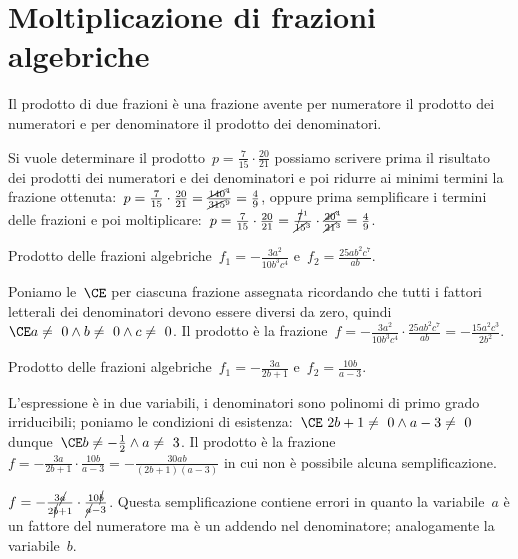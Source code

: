 

\section{Moltiplicazione di frazioni algebriche}
\label{sec:frazalg_moltiplicazione}

Il prodotto di due frazioni è una frazione avente per numeratore il prodotto 
dei numeratori e per denominatore il prodotto dei denominatori.

Si vuole determinare il prodotto~$p=\frac{7}{15}\cdot \frac{20}{21}$ possiamo 
scrivere prima il risultato dei prodotti dei numeratori e dei denominatori e 
poi ridurre ai minimi termini la frazione
ottenuta:~$p=\frac{7}{15}\cdot \frac{20}{21}=
\frac{\cancel{140}^4}{\cancel{315}^9}=\frac{4}{9}$,
oppure prima semplificare i termini delle frazioni e poi
moltiplicare:~$p=\frac{7}{15}\cdot \frac{20}{21}=
\frac{\cancel{7}^1}{\cancel{15}^3}\cdot \frac{\cancel{20}^4}{\cancel{21}^3}=
\frac{4}{9}$.

 \begin{esempio}
Prodotto delle frazioni 
algebriche~$f_{1}=-{\frac{3a^{2}}{10b^{3}c^{4}}}$ 
e~$f_{2}=\frac{25ab^{2}c^{7}}{ab}$.

Poniamo le~$\CE$ per ciascuna frazione assegnata ricordando che tutti i 
fattori letterali dei denominatori devono essere diversi da zero,
quindi~$\CE a\neq~0\wedge b\neq~0\wedge c\neq~0$.
Il prodotto è la 
frazione~$f=-{\frac{3a^{2}}{10b^{3}c^{4}}}\cdot\frac{25ab^{2}c^{7}}{ab}=
-{\frac{15a^{2}c^{3}}{2b^{2}}}$.
 \end{esempio}

 \begin{esempio}
Prodotto delle frazioni algebriche~$f_{1}=-{\frac{3a}{2b+1}}$ 
e~$f_{2}=\frac{10b}{a-3}$.

L'espressione è in due variabili, i denominatori sono polinomi di primo grado 
irriducibili; poniamo le condizioni di
esistenza:~$\CE~2b+1\neq~0\wedge a-3\neq~0$ 
dunque~$\CE b\neq -{\frac{1}{2}}\wedge a\neq~3$.
Il prodotto è la frazione~$f=-{\frac{3a}{2b+1}}\cdot\frac{10b}{a-3}=
-{\frac{30ab}{(2b+1)(a-3)}}$ in cui non è possibile alcuna semplificazione.

\osservazione
$f=-{\frac{3\cancel{a}}{2\cancel{b}+1}}\cdot\frac{10\cancel{b}}{\cancel{a}-3}$. 
Questa semplificazione contiene errori in quanto la variabile~$a$ è un fattore 
del numeratore ma è un addendo nel denominatore; analogamente la variabile~$b$.
 \end{esempio}

